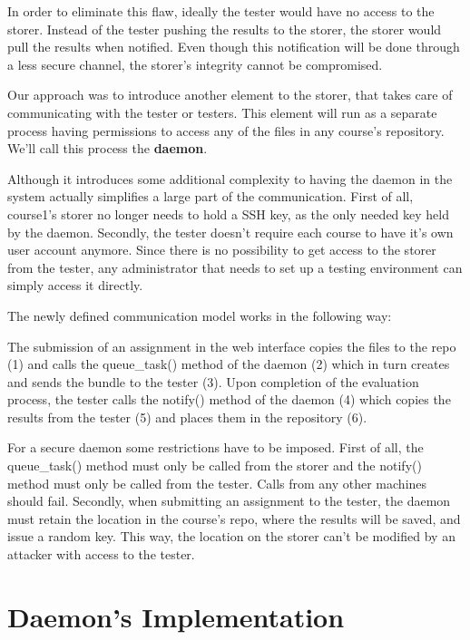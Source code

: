 In order to eliminate this flaw, ideally the tester would have no access to the
storer. Instead of the tester pushing the results to the storer, the storer
would pull the results when notified. Even though this notification will be done
through a less secure channel, the storer's integrity cannot be compromised.

Our approach was to introduce another element to the storer, that takes care
of communicating with the tester or testers. This element will run as a separate
process having permissions to access any of the files in any course's repository.
We'll call this process the \textbf{daemon}.

Although it introduces some additional complexity to 
having the daemon in the system actually simplifies a large part of the communication.
First of all, course1's storer no longer needs to hold a SSH key, as the only needed
key held by the daemon. Secondly, the tester doesn't require each course to have
it's own user account anymore. Since there is no possibility to get access to the 
storer from the tester, any administrator that needs to set up a testing environment
can simply access it directly.

The newly defined communication model works in the following way:

The submission of an assignment in the web interface copies the files to the
repo (1) and calls the queue_task() method of the daemon (2) which in turn
creates and sends the bundle to the tester (3).
Upon completion of the evaluation process, the tester calls the notify() 
method of the daemon (4) which copies the results from the tester (5)
and places them in the repository (6).

For a secure daemon some restrictions have to be imposed. First of all, the 
queue_task() method must only be called from the storer and the
notify() method must only be called from the tester. Calls from any other
machines should fail. Secondly, when submitting an assignment to the tester,
the daemon must retain the location in the course's repo, where the results will
be saved, and issue a random key. This way, the location on the storer can't be
modified by an attacker with access to the tester.


\begin{center}
\end{center}


\section{Daemon's Implementation}
\label{sec:vmc-daemon}

